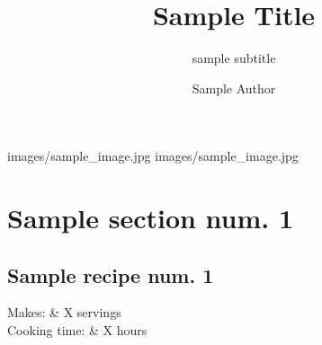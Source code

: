 \documentclass{RecipeBook}
\begin{document}
	{images/sample_image.jpg}
	{images/sample_image.jpg}
	
\makecontents

\section{Sample section num. 1}
\subsection{Sample recipe num. 1}

\author{Sample Author}

\title{Sample Title}
\subtitle{\hspace*{0.5in}sample subtitle}

\begin{info}
	Makes: & X servings \\
	Cooking time: & X hours
\end{info}
\end{document}
